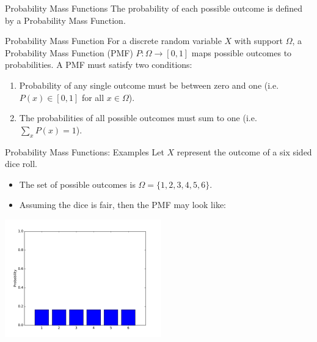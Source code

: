 \documentclass[serif,xcolor=pdftex,dvipsnames,table,hyperref={bookmarks=false,breaklinks}]{beamer}
\begin{document}
\begin{frame}[t]{Probability Mass Functions}
	The probability of each possible outcome is defined by a Probability Mass Function.
	
	\begin{block}{Probability Mass Function}
		For a discrete random variable $X$ with support $\Omega$, a Probability Mass Function (PMF) $P:\Omega\to [0,1]$ maps possible outcomes to probabilities. A PMF must satisfy two conditions:
		\begin{enumerate}[<+->]
			\item Probability of any single outcome must be between zero and one (i.e. $P(x) \in [0,1]$ for all $x \in \Omega$).
			\item The probabilities of all possible outcomes must sum to one (i.e. $\sum_x P(x) = 1$).
		\end{enumerate}
	\end{block}
\end{frame}

\begin{frame}[t]{Probability Mass Functions: Examples}
	Let $X$ represent the outcome of a six sided dice roll.
	\begin{itemize}[<+->]
		\item The set of possible outcomes is $\Omega = \{1,2,3,4,5,6\}$.
		\item Assuming the dice is fair, then the PMF may look like:
	\end{itemize}
	\pause
	\centering
	\includegraphics[height=2in]{../Figures/uniform_multinomial.pdf}
\end{frame}
\end{document}
